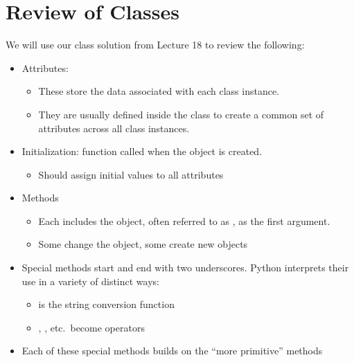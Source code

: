 \documentclass[letterpaper,10pt,english]{sphinxmanual}
\begin{document}
\section{Review of Classes}
\label{\detokenize{lecture_notes/lec19_classes2:review-of-classes}}
We will use our  class solution from Lecture 18 to review
the following:
\begin{itemize}
\item {} 
Attributes:
\begin{itemize}
\item {} 
These store the data associated with each class instance.

\item {} 
They are usually defined inside the class to create a common set
of attributes across all class instances.

\end{itemize}

\item {} 
Initialization: function  called when the object is
created.
\begin{itemize}
\item {} 
Should assign initial values to all attributes

\end{itemize}

\item {} 
Methods
\begin{itemize}
\item {} 
Each includes the object, often referred to as , as the
first argument.

\item {} 
Some change the object, some create new objects

\end{itemize}

\item {} 
Special methods start and end with two underscores. Python interprets their
use in a variety of distinct ways:
\begin{itemize}
\item {} 
 is the string conversion function

\item {} 
, , etc. become operators

\end{itemize}

\item {} 
Each of these special methods builds on the “more primitive”
methods

\end{itemize}
\end{document}
